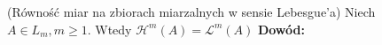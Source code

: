 \begin{lem}(Równość miar na zbiorach miarzalnych w sensie Lebesgue'a)
    Niech $A \in L_m, m \geq 1$. Wtedy $\mathcal{H}^m(A) = \mathcal{L}^m(A)$ 
    \newline
    \textbf{Dowód:} \citep[4.36]{Tworzewski}
\end{lem}
